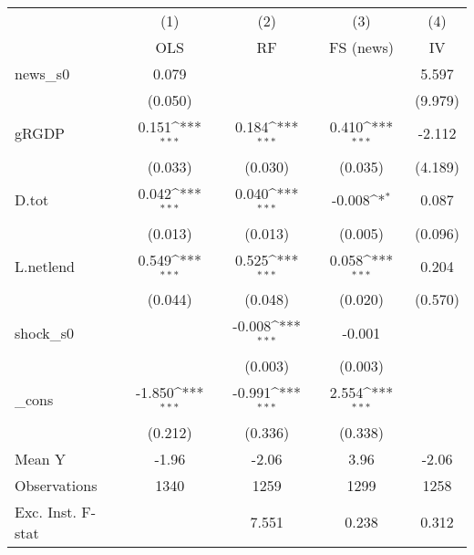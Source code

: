 {
\def\sym#1{\ifmmode^{#1}\else\(^{#1}\)\fi}
\begin{tabular}{l*{4}{c}}
\toprule
            &\multicolumn{1}{c}{(1)}&\multicolumn{1}{c}{(2)}&\multicolumn{1}{c}{(3)}&\multicolumn{1}{c}{(4)}\\
            &\multicolumn{1}{c}{OLS}&\multicolumn{1}{c}{RF}&\multicolumn{1}{c}{FS (news)}&\multicolumn{1}{c}{IV}\\
\midrule
news\_s0     &       0.079         &                     &                     &       5.597         \\
            &     (0.050)         &                     &                     &     (9.979)         \\
\addlinespace
gRGDP       &       0.151\sym{***}&       0.184\sym{***}&       0.410\sym{***}&      -2.112         \\
            &     (0.033)         &     (0.030)         &     (0.035)         &     (4.189)         \\
\addlinespace
D.tot       &       0.042\sym{***}&       0.040\sym{***}&      -0.008\sym{*}  &       0.087         \\
            &     (0.013)         &     (0.013)         &     (0.005)         &     (0.096)         \\
\addlinespace
L.netlend   &       0.549\sym{***}&       0.525\sym{***}&       0.058\sym{***}&       0.204         \\
            &     (0.044)         &     (0.048)         &     (0.020)         &     (0.570)         \\
\addlinespace
shock\_s0    &                     &      -0.008\sym{***}&      -0.001         &                     \\
            &                     &     (0.003)         &     (0.003)         &                     \\
\addlinespace
\_cons      &      -1.850\sym{***}&      -0.991\sym{***}&       2.554\sym{***}&                     \\
            &     (0.212)         &     (0.336)         &     (0.338)         &                     \\
\midrule
Mean Y      &       -1.96         &       -2.06         &        3.96         &       -2.06         \\
Observations&        1340         &        1259         &        1299         &        1258         \\
Exc. Inst. F-stat&                     &       7.551         &       0.238         &       0.312         \\
\bottomrule
\end{tabular}
}
